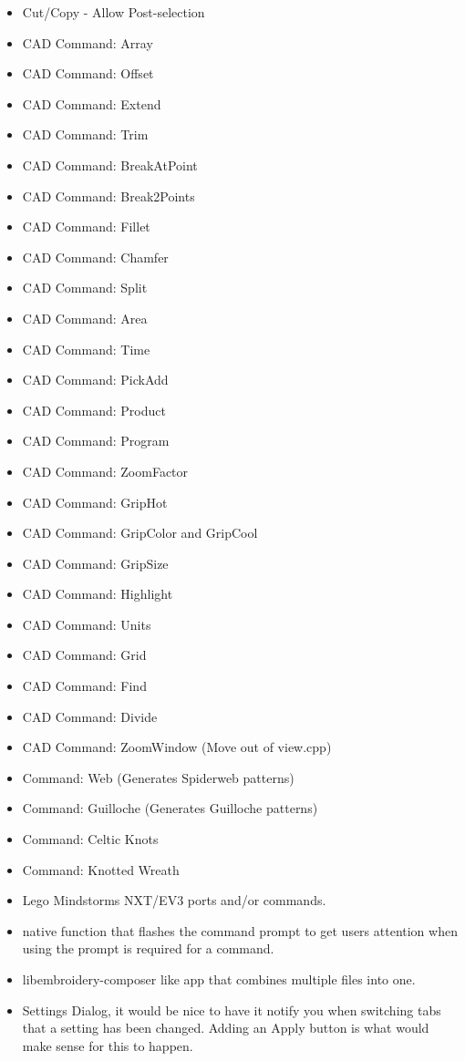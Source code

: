 \documentclass[a4paper]{report}
\begin{document}
\begin{itemize}
  \item Cut/Copy - Allow Post-selection
  \item CAD Command: Array
  \item CAD Command: Offset
  \item CAD Command: Extend
  \item CAD Command: Trim
  \item CAD Command: BreakAtPoint
  \item CAD Command: Break2Points
  \item CAD Command: Fillet
  \item CAD Command: Chamfer
  \item CAD Command: Split
  \item CAD Command: Area
  \item CAD Command: Time
  \item CAD Command: PickAdd
  \item CAD Command: Product
  \item CAD Command: Program
  \item CAD Command: ZoomFactor
  \item CAD Command: GripHot
  \item CAD Command: GripColor and GripCool
  \item CAD Command: GripSize
  \item CAD Command: Highlight
  \item CAD Command: Units
  \item CAD Command: Grid
  \item CAD Command: Find
  \item CAD Command: Divide
  \item CAD Command: ZoomWindow (Move out of view.cpp)
  \item Command: Web (Generates Spiderweb patterns)
  \item Command: Guilloche (Generates Guilloche patterns)
  \item Command: Celtic Knots
  \item Command: Knotted Wreath
  \item Lego Mindstorms NXT/EV3 ports and/or commands.
  \item native function that flashes the command prompt to get users attention when using the prompt is required for a command.
  \item libembroidery-composer like app that combines multiple files into one.
  \item Settings Dialog, it would be nice to have it notify you when switching tabs that a setting has been changed. Adding an Apply button is what would make sense for this to happen.

\end{itemize}
\end{document}
